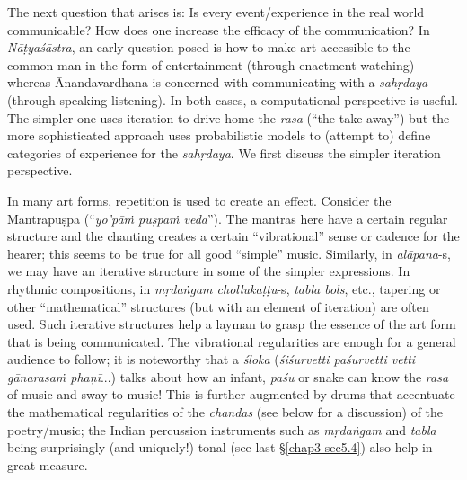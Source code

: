 The next question that arises is: Is every event/experience in the real world communicable? How does one increase the efficacy of the communication? In \textsl{Nāṭyaśāstra}, an early question posed is how to make art accessible to the common man in the form of entertainment (through enactment-watching) whereas Ānandavardhana is concerned with communicating with a \textsl{sahṛdaya} (through speaking-listening). In both cases, a computational perspective is useful. The simpler one uses iteration to drive home the \textsl{rasa} (“the take-away”) but the more sophisticated approach uses probabilistic models to (attempt to) define categories of experience for the \textsl{sahṛdaya}. We first discuss the simpler iteration perspective. 

In many art forms, repetition is used to create an effect. Consider the Mantrapuṣpa (“\textsl{yo’pāṁ puṣpaṁ veda}”). The mantras here have a certain regular structure and the chanting creates a certain “vibrational” sense or cadence for the hearer; this seems to be true for all good “simple” music. Similarly, in \textsl{alāpana}-s, we may have an iterative structure in some of the simpler expressions. In rhythmic compositions, in \textsl{mṛdaṅgam chollukaṭṭu}-s, \textsl{tabla bols}, etc., tapering or other “mathematical” structures (but with an element of iteration) are often used. Such iterative structures help a layman to grasp the essence of the art form that is being communicated. The vibrational regularities are enough for a general audience to follow; it is noteworthy that a \textsl{śloka} (\textsl{śiśurvetti paśurvetti vetti gānarasaṁ phaṇī}...) talks about how an infant, \textsl{paśu} or snake can know the \textsl{rasa} of music and sway to music! This is further augmented by drums that accentuate the mathematical regularities of the \textsl{chandas} (see below for a discussion) of the poetry/music; the Indian percussion instruments such as \textsl{mṛdaṅgam} and \textsl{tabla} being surprisingly (and uniquely!) tonal (see last \S\ref{chap3-sec5.4}) also help in great measure. 

